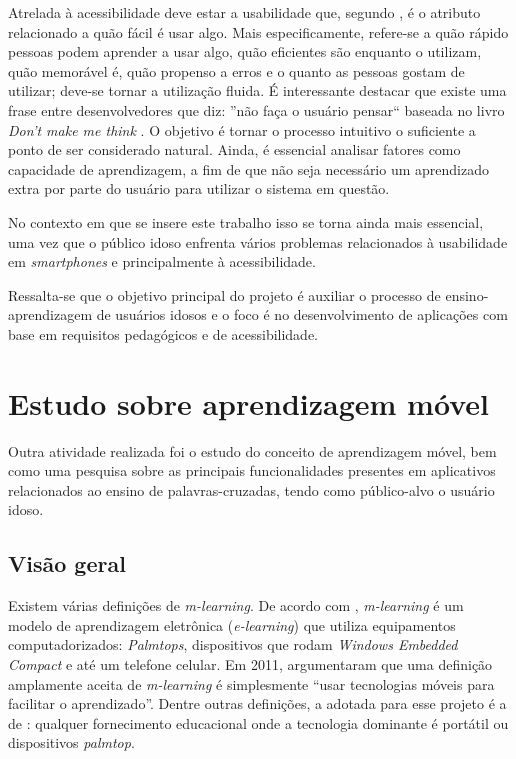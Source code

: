 Atrelada à acessibilidade deve estar a usabilidade que, segundo \cite{nielsenPrioritizingWebUsability},
é o atributo relacionado a quão fácil é usar algo. Mais especificamente, refere-se a quão rápido pessoas podem aprender a usar algo, quão eficientes são enquanto o utilizam, quão memorável é, quão propenso a erros e o quanto as pessoas gostam de utilizar; deve-se tornar a utilização fluida. É interessante destacar que existe uma frase entre desenvolvedores que diz: ''não faça o usuário pensar`` baseada no livro \textit{Don't make me think} \citep{steveDont2005}. O objetivo é tornar o processo intuitivo o suficiente a ponto de ser considerado natural.
Ainda, é essencial analisar fatores como capacidade de aprendizagem, a fim de que não seja necessário um aprendizado extra por parte do usuário para utilizar o sistema em questão.

No contexto em que se insere este trabalho isso se torna ainda mais essencial, uma vez que o público idoso enfrenta vários problemas relacionados à usabilidade em \textit{smartphones} \citep{dificuldadesIdosos} e principalmente à acessibilidade. %


Ressalta-se que o objetivo principal do projeto é auxiliar o processo de ensino-aprendizagem de usuários idosos e o foco é no desenvolvimento de aplicações com base em requisitos pedagógicos e de acessibilidade.

\section{Estudo sobre aprendizagem móvel}\label{sec:estudos_ap_movel} 
Outra atividade realizada foi o estudo do conceito de aprendizagem móvel, bem como uma pesquisa sobre as principais funcionalidades presentes em aplicativos relacionados ao ensino de palavras-cruzadas, tendo como público-alvo o usuário idoso.

\subsection{Visão geral}
Existem várias definições de \textit{m-learning}. %
De acordo com \cite{Quinn2000}, \textit{m-learning} é um modelo de aprendizagem eletrônica (\textit{e-learning}) que utiliza equipamentos computadorizados: \textit{Palmtops}, dispositivos que rodam \textit{Windows Embedded Compact} e até um telefone celular.
Em 2011, \cite{hwang2011research} argumentaram que uma definição amplamente aceita de \textit{m-learning} é simplesmente ``usar tecnologias móveis para facilitar o aprendizado''. Dentre outras definições, a adotada para esse projeto é a de \cite{traxler2005defining}: qualquer fornecimento educacional onde a tecnologia dominante é portátil ou dispositivos \textit{palmtop}.

